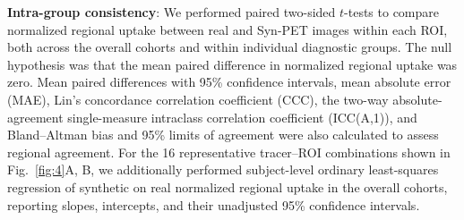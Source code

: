 \item \textbf{Intra-group consistency}: We performed paired two-sided $t$-tests to compare normalized regional uptake between real and Syn-PET images within each ROI, both across the overall cohorts and within individual diagnostic groups. The null hypothesis was that the mean paired difference in normalized regional uptake was zero. Mean paired differences with 95\% confidence intervals, mean absolute error (MAE), Lin's concordance correlation coefficient (CCC), the two-way absolute-agreement single-measure intraclass correlation coefficient (ICC(A,1)), and Bland--Altman bias and 95\% limits of agreement were also calculated to assess regional agreement. For the 16 representative tracer--ROI combinations shown in Fig.~\ref{fig:4}A, B, we additionally performed subject-level ordinary least-squares regression of synthetic on real normalized regional uptake in the overall cohorts, reporting slopes, intercepts, and their unadjusted 95\% confidence intervals.
